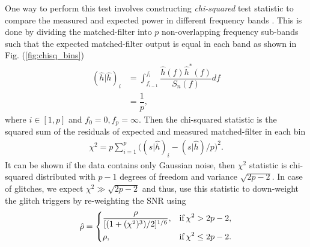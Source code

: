 One way to perform this test involves constructing \textit{chi-squared} test statistic to compare the measured and expected power in different frequency bands \cite{Allen:2004gu}. This is done by dividing the matched-filter into $p$ non-overlapping frequency sub-bands such that the expected matched-filter output is equal in each band as shown in Fig. (\ref{fig:chisq_bins})
\begin{align}
    (\hat{h}|\hat{h})_i &= \int_{f_{i-1}}^{f_i} \dfrac{\hat{h}(f)\hat{h}^*(f)}{S_n(f)} df\\
    & = \dfrac{1}{p},
\end{align}
where $i \in [1, p]$ and $f_0 = 0, f_p = \infty$. Then the chi-squared statistic is the squared sum of the residuals of expected and measured matched-filter in each bin 
\begin{align}
    \chi^2 = p\sum_{i=1}^{p} \Bigg( (s|\hat{h})_i - (s|\hat{h})/p\Bigg)^2.
\end{align}
It can be shown if the data contains only Gaussian noise, then $\chi^2$ statistic is chi-squared distributed with $p-1$ degrees of freedom and variance $\sqrt{2p-2}$. In case of glitches, we expect $\chi^2 \gg \sqrt{2p-2}$ and thus, use this statistic to down-weight the glitch triggers by re-weighting the SNR using 
\begin{align}
    \hat{\rho} = \left\{
    \begin{aligned}
        &\dfrac{\rho}{[(1+(\chi^2)^3)/2]^{1/6}},  &\text{if}\hspace{0.2em}  \chi^2 > 2p-2, \\
        & \rho, & \text{if} \hspace{0.2em} \chi^2 \leq 2p-2.
    \end{aligned}
    \right.
\end{align}

